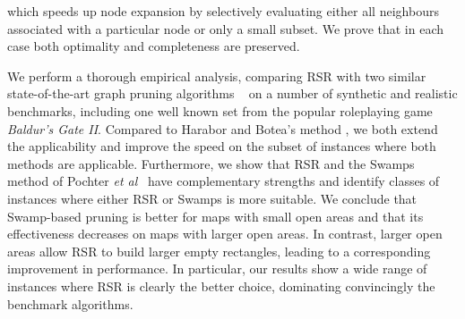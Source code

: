 which speeds up node expansion by selectively evaluating either all neighbours
associated with a particular node or only a small subset.  We prove that in each
case both optimality and completeness are preserved.
\par
We perform a thorough empirical analysis, comparing RSR with two similar
state-of-the-art graph pruning algorithms ~\cite{pochter10,harabor10} on a
number of synthetic and realistic benchmarks, including one well known set from
the popular roleplaying game \emph{Baldur's Gate II}.  Compared to Harabor and
Botea's method \cite{harabor10}, we both extend the applicability and improve
the speed on the subset of instances where both methods are applicable.
Furthermore, we show that RSR and the Swamps method of Pochter \emph{et
al}~\cite{pochter10} have complementary strengths and identify classes of
instances where either RSR or Swamps is more suitable.  We conclude that
Swamp-based pruning is better for maps with small open areas and that its
effectiveness decreases on maps with larger open areas.  In contrast, larger
open areas allow RSR to build larger empty rectangles, leading to a
corresponding improvement in performance.  In particular, our results show a
wide range of instances where RSR is clearly the better choice, dominating
convincingly the benchmark algorithms.


